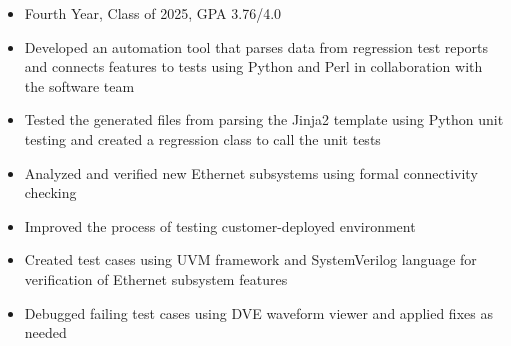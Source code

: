 \documentclass[10pt,a4paper]{altacv}
\begin{document}
\tagline{ }


\begin{fullwidth}
\makecvheader
\end{fullwidth}



\begin{itemize}
\item Fourth Year, Class of 2025, GPA 3.76/4.0
\end{itemize}




\begin{itemize}
\item Developed an automation tool that parses data from regression test reports and connects features to tests using Python and Perl in collaboration with the software team
\item Tested the generated files from parsing the Jinja2 template using Python unit testing and created a regression class to call the unit tests
\item Analyzed and verified new Ethernet subsystems using formal connectivity checking
\item Improved the process of testing customer-deployed environment
\item Created test cases using UVM framework and SystemVerilog language for verification of Ethernet subsystem features
\item Debugged failing test cases using DVE waveform viewer and applied fixes as needed
\end{itemize}
\end{document}
